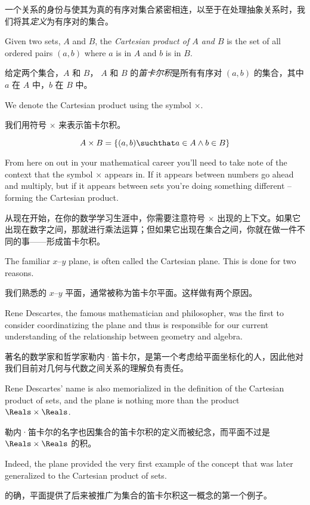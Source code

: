 一个关系的身份与使其为真的有序对集合紧密相连，以至于在处理抽象关系时，我们将其\emph{定义}为有序对的集合。

Given two sets, $A$ and $B$, the 
\emph{Cartesian product of $A$ and $B$} 
is the set of all ordered pairs $(a,b)$ where $a$ is in $A$ and $b$ is in $B$.

给定两个集合，$A$ 和 $B$，
$A$ 和 $B$ 的\emph{笛卡尔积}是所有有序对 $(a,b)$ 的集合，其中 $a$ 在 $A$ 中，$b$ 在 $B$ 中。

We denote the Cartesian product using the symbol $\times$.  

我们用符号 $\times$ 来表示笛卡尔积。

\[ A \times B = \{ (a,b) \suchthat a \in A \land b \in B \} \]

\noindent From here on out
in your mathematical career you'll need to take note of the context that
the symbol $\times$ appears in.  If it appears between numbers go ahead and
multiply, but if it appears between sets you're doing something different --
forming the Cartesian product.

\noindent 从现在开始，在你的数学学习生涯中，你需要注意符号 $\times$ 出现的上下文。如果它出现在数字之间，那就进行乘法运算；但如果它出现在集合之间，你就在做一件不同的事——形成笛卡尔积。

The familiar $x$--$y$ plane, is often called the Cartesian plane.  This
is done for two reasons.

我们熟悉的 $x$--$y$ 平面，通常被称为笛卡尔平面。这样做有两个原因。

Rene Descartes, the famous
mathematician and philosopher, was the first to consider coordinatizing
the plane and thus is responsible for our current understanding of the
relationship between geometry and algebra.

著名的数学家和哲学家勒内·笛卡尔，是第一个考虑给平面坐标化的人，因此他对我们目前对几何与代数之间关系的理解负有责任。

Rene Descartes' name is also
memorialized in the definition of the Cartesian product of sets, and the
plane is nothing more than the product $\Reals \times \Reals$.

勒内·笛卡尔的名字也因集合的笛卡尔积的定义而被纪念，而平面不过是 $\Reals \times \Reals$ 的积。

Indeed,
the plane provided the very first example of the concept that was later
generalized to the Cartesian product of sets.

的确，平面提供了后来被推广为集合的笛卡尔积这一概念的第一个例子。

